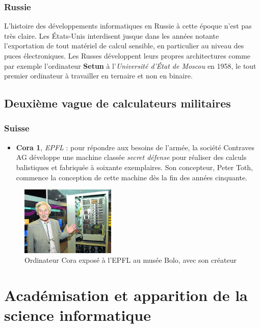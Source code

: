 \documentclass[a4paper,11pt]{book}
\begin{document}
\subsubsection{Russie}
L'histoire des développements informatiques en Russie à cette époque n'est pas très claire. Les États-Unis interdisent jusque dans les années notante l'exportation de tout matériel de calcul sensible, en particulier au niveau des puces électroniques. Les Russes développent leurs propres architectures comme par exemple l'ordinateur \textbf{Setun} à l'\textit{Université d'État de Moscou} en 1958, le tout premier ordinateur à travailler en ternaire et non en binaire.
 
 \subsection{Deuxième vague de calculateurs militaires}
 \subsubsection{Suisse}
 \begin{itemize}
     \item \textbf{Cora 1}, \textit{EPFL} : pour répondre aux besoins de l'armée, la société Contraves AG développe une machine classée \textit{secret défense} pour réaliser des calculs balistiques et fabriquée à soixante exemplaires. Son concepteur, Peter Toth, commence la conception de cette machine dès la fin des années cinquante.
 \end{itemize}

\begin{figure}[h]
    \centering
    \includegraphics[width=0.4\textwidth]{media/machines/cora.jpeg}
    \caption{Ordinateur Cora exposé à l'EPFL au musée Bolo, avec son créateur}
\end{figure}

\section{Académisation et apparition de la science informatique}
\end{document}
